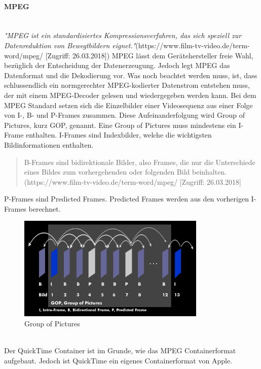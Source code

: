 \paragraph{MPEG}
\leavevmode \\
\textit{"MPEG ist ein standardisiertes Kompressionsverfahren, das sich speziell zur Datenreduktion von Bewegtbildern eignet."}(https://www.film-tv-video.de/term-word/mpeg/ [Zugriff: 26.03.2018]) MPEG lässt dem Gerätehersteller freie Wahl, bezüglich der Entscheidung der Datenerzeugung. Jedoch legt MPEG das Datenformat und die Dekodierung vor. Was noch beachtet werden muss, ist, dass schlussendlich ein normgerechter MPEG-kodierter Datenstrom entstehen muss, der mit einem MPEG-Decoder gelesen und wiedergegeben werden kann. Bei dem MPEG Standard setzen sich die Einzelbilder einer Videosequenz aus einer Folge von I-, B- und P-Frames zusammen. Diese Aufeinanderfolgung wird Group of Pictures, kurz GOP, genannt. Eine Group of Pictures muss mindestens ein I-Frame enthalten. I-Frames sind Indexbilder, welche die wichtigsten Bildinformationen enthalten. \begin{quote}B-Frames sind  bidirektionale Bilder, also Frames, die nur die Unterschiede eines Bildes zum vorhergehenden oder folgenden Bild beinhalten.(https://www.film-tv-video.de/term-word/mpeg/ [Zugriff: 26.03.2018]\end{quote} 
P-Frames sind Predicted Frames. Predicted Frames werden aus den vorherigen I-Frames berechnet.\newline
\begin{figure}[H]
	\centering
	\includegraphics[width=0.8\textwidth]{abb27} 
	\caption[Group of Pictures]{Group of Pictures\footnotemark}
\end{figure}
\leavevmode \\
Der QuickTime Container ist im Grunde, wie das MPEG Containerformat aufgebaut. Jedoch ist QuickTime ein eigenes Containerformat von Apple.\citep{mpeg}
